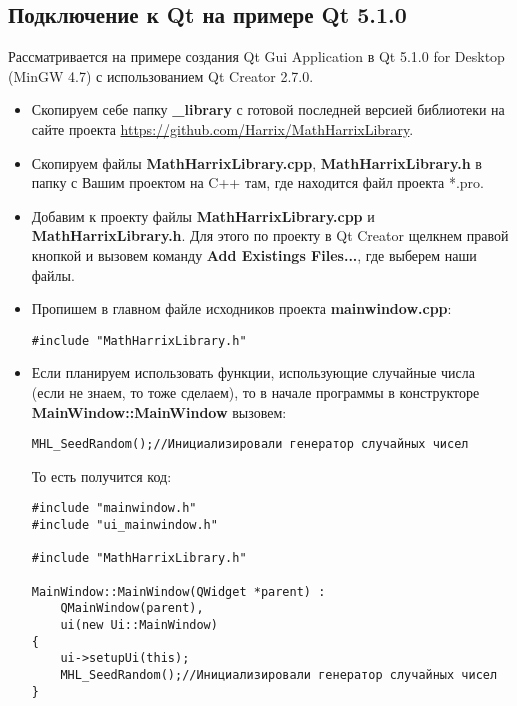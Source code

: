\documentclass[a4paper,12pt]{article}
\begin{document}
\subsection{Подключение к Qt на примере Qt 5.1.0}

Рассматривается на примере создания Qt Gui Application в Qt 5.1.0 for Desktop (MinGW 4.7) с использованием Qt Creator 2.7.0.

\begin{itemize}
\item Скопируем себе папку \textbf{\_library} с готовой последней версией библиотеки на сайте проекта \href{https://github.com/Harrix/MathHarrixLibrary}{https://github.com/Harrix/MathHarrixLibrary}.

\item Скопируем файлы \textbf{MathHarrixLibrary.cpp}, \textbf{MathHarrixLibrary.h} в папку с Вашим проектом на C++ там, где находится файл проекта *.pro.

\item Добавим к проекту файлы \textbf{MathHarrixLibrary.cpp} и \textbf{MathHarrixLibrary.h}. Для этого по проекту в Qt Creator щелкнем правой кнопкой и вызовем команду \textbf{Add Existings Files...}, где выберем наши файлы.

\item Пропишем в главном файле исходников проекта \textbf{mainwindow.cpp}:
\begin{lstlisting}[label=install_01_qt,caption=Подключение библиотеки]
#include "MathHarrixLibrary.h"
\end{lstlisting}

\item Если планируем использовать функции, использующие случайные числа (если не знаем, то тоже сделаем), то в начале программы в конструкторе \textbf{MainWindow::MainWindow} вызовем:
\begin{lstlisting}[label=install_02_qt,caption=Инициализация генератора случайных чисел]
MHL_SeedRandom();//Инициализировали генератор случайных чисел
\end{lstlisting}

То есть получится код:
\begin{lstlisting}[label=install_03_qt,caption=Пример файла mainwindow.cpp с подключенной библиотекой]
#include "mainwindow.h"
#include "ui_mainwindow.h"

#include "MathHarrixLibrary.h"

MainWindow::MainWindow(QWidget *parent) :
    QMainWindow(parent),
    ui(new Ui::MainWindow)
{
    ui->setupUi(this);
    MHL_SeedRandom();//Инициализировали генератор случайных чисел    
}


\end{lstlisting}
\end{itemize}
\end{document}
